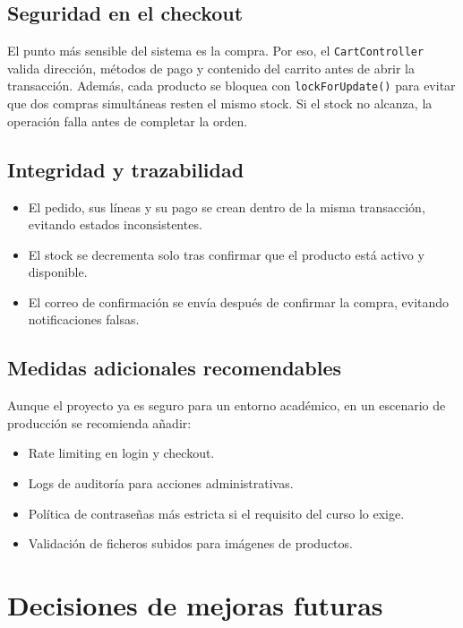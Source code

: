 \documentclass[12pt,a4paper]{report}
\begin{document}
\section{Seguridad en el checkout}

El punto más sensible del sistema es la compra. Por eso, el \texttt{CartController} valida dirección, métodos de pago y contenido del carrito antes de abrir la transacción. Además, cada producto se bloquea con \texttt{lockForUpdate()} para evitar que dos compras simultáneas resten el mismo stock. Si el stock no alcanza, la operación falla antes de completar la orden.

\section{Integridad y trazabilidad}

\begin{itemize}
  \item El pedido, sus líneas y su pago se crean dentro de la misma transacción, evitando estados inconsistentes.
  \item El stock se decrementa solo tras confirmar que el producto está activo y disponible.
  \item El correo de confirmación se envía después de confirmar la compra, evitando notificaciones falsas.
\end{itemize}

\section{Medidas adicionales recomendables}

Aunque el proyecto ya es seguro para un entorno académico, en un escenario de producción se recomienda añadir:

\begin{itemize}
  \item Rate limiting en login y checkout.
  \item Logs de auditoría para acciones administrativas.
  \item Política de contraseñas más estricta si el requisito del curso lo exige.
  \item Validación de ficheros subidos para imágenes de productos.
\end{itemize}

\chapter{Decisiones de mejoras futuras}
\end{document}
